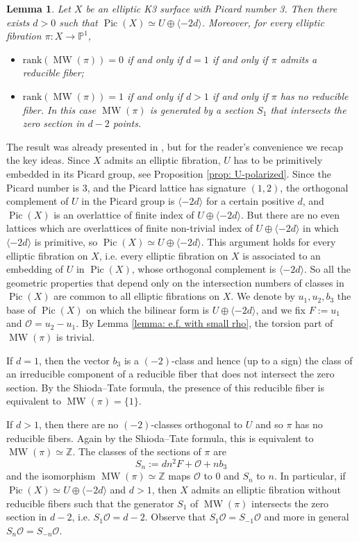 \documentclass{amsart}
\newtheorem{lemma}[theorem]{Lemma}
\theoremstyle{definition}
\numberwithin{equation}{section}
\newcommand{\rk}{\mbox{rank}}
\newcommand{\ra}{\rightarrow}
\newcommand{\Z}{\mathbb{Z}}
\renewcommand{\O}{\mathcal{O}}
\DeclareMathOperator{\Pic}{Pic}
\DeclareMathOperator{\MW}{MW}
\begin{document}
\begin{lemma}\label{lemma:familyLd}
Let $X$ be an elliptic K3 surface with Picard number  3.
Then there exists $d>0$ such that $\Pic(X)\simeq U\oplus\langle -2d\rangle$. Moreover, for every elliptic fibration $\pi:X\ra\mathbb{P}^1$, \begin{itemize}
\item  $\rk(\MW(\pi))=0$ if and only if $d=1$ if and only if $\pi$ admits a reducible fiber;
\item $\rk(\MW(\pi))=1$ if and only if $d>1$ if and only if $\pi$ has no reducible fiber. In this case $\MW(\pi)$ is generated by a section $S_1$ that intersects the zero section in $d-2$ points.\end{itemize}
\end{lemma}
\proof The result was already presented in \cite[Sec. 4.3]{G}, but for the reader's convenience we recap the key ideas. Since $X$ admits an elliptic fibration, $U$ has to be primitively embedded in its Picard group, see Proposition \ref{prop: U-polarized}. Since the Picard number is 3, and the Picard lattice has signature $(1,2)$, the orthogonal complement of $U$ in the Picard group is $\langle -2d\rangle$ for a certain positive $d$, and $\Pic(X)$ is an overlattice of finite index of $U\oplus \langle -2d\rangle$. But there are no even lattices which are overlattices of finite non-trivial index of $U\oplus \langle -2d\rangle$ in which $\langle -2d\rangle$ is primitive, so $\Pic(X)\simeq U\oplus\langle -2d\rangle$. This argument holds for every elliptic fibration on $X$, i.e. every elliptic fibration on $X$ is associated to an embedding of $U$ in $\Pic(X)$, whose orthogonal complement is $\langle -2d\rangle$. So all the geometric properties that depend only on the intersection numbers of classes in $\Pic(X)$ are common to all elliptic fibrations on $X$.
We denote by $u_1,u_2,b_3$ the base of $\Pic(X)$ on which the bilinear form is $U\oplus\langle -2d\rangle$,  and we fix $F:=u_1$ and $\mathcal{O}=u_2-u_1$. By Lemma \ref{lemma: e.f. with small rho}, the torsion part of $\MW(\pi)$ is trivial.

If $d=1$, then the vector $b_3$ is a $(-2)$-class and hence (up to a sign) the class of an irreducible component of a reducible fiber that does not intersect the zero section. By the Shioda--Tate formula, the presence of this reducible fiber is equivalent to $\MW(\pi)=\{1\}$. 

If $d>1$, then there are no $(-2)$-classes orthogonal to $U$ and so $\pi$ has no reducible fibers. Again by the Shioda--Tate formula, this is equivalent to $\MW(\pi)\simeq \Z$. 
The classes of the sections of $\pi$ are 
$$S_n:=dn^2F+\mathcal{O}+nb_3$$ and the isomorphism $\MW(\pi)\simeq \Z$ maps $\mathcal{O}$ to $0$ and $S_n$ to $n$. In particular, if $\Pic(X)\simeq U\oplus \langle -2d\rangle$ and $d>1$, then $X$ admits an elliptic fibration without reducible fibers such that the generator $S_1$ of $\MW(\pi)$ intersects the zero section in $d-2$, i.e. $S_1\mathcal{O}=d-2$. Observe that $S_1\O=S_{-1}\O$ and more in general $S_n\O=S_{-n}\O$.\endproof
\end{document}
